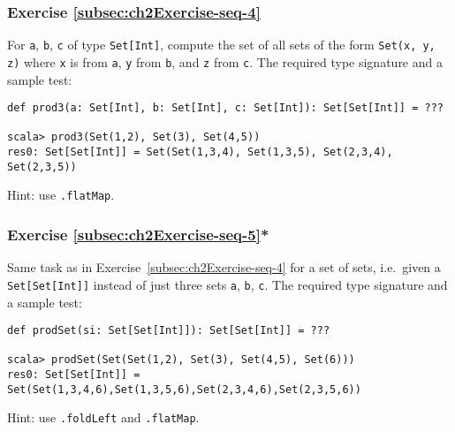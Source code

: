 \subsubsection{Exercise \label{subsec:ch2Exercise-seq-4}\ref{subsec:ch2Exercise-seq-4}}

For \lstinline!a!, \lstinline!b!, \lstinline!c! of type \lstinline!Set[Int]!,
compute the set of all sets of the form \lstinline!Set(x, y, z)!
where \lstinline!x! is from \lstinline!a!, \lstinline!y! from \lstinline!b!,
and \lstinline!z! from \lstinline!c!. The required type signature
and a sample test:
\begin{lstlisting}
def prod3(a: Set[Int], b: Set[Int], c: Set[Int]): Set[Set[Int]] = ???

scala> prod3(Set(1,2), Set(3), Set(4,5))
res0: Set[Set[Int]] = Set(Set(1,3,4), Set(1,3,5), Set(2,3,4), Set(2,3,5))
\end{lstlisting}

Hint: use \lstinline!.flatMap!.%
\begin{comment}
Solution:
\begin{lstlisting}
def prod3(a: Set[Int], b: Set[Int], c: Set[Int]): Set[Set[Int]] =     a.flatMap(x => b.flatMap(y => c.map(z => Set(x, y, z))))
\end{lstlisting}
\end{comment}


\subsubsection{Exercise \label{subsec:ch2Exercise-seq-5}\ref{subsec:ch2Exercise-seq-5}{*}}

Same task as in Exercise~\ref{subsec:ch2Exercise-seq-4} for a set
of sets, i.e.~given a \lstinline!Set[Set[Int]]! instead of just
three sets \lstinline!a!, \lstinline!b!, \lstinline!c!. The required
type signature and a sample test:
\begin{lstlisting}
def prodSet(si: Set[Set[Int]]): Set[Set[Int]] = ???

scala> prodSet(Set(Set(1,2), Set(3), Set(4,5), Set(6)))
res0: Set[Set[Int]] = Set(Set(1,3,4,6),Set(1,3,5,6),Set(2,3,4,6),Set(2,3,5,6))
\end{lstlisting}

Hint: use \lstinline!.foldLeft! and \lstinline!.flatMap!.%
\begin{comment}
Solution:
\begin{lstlisting}
def prodSet(sets: Set[Set[Int]]): Set[Set[Int]] =     sets.foldLeft(Set[Set[Int]](Set())) {
      // Combine each of results so far with each element in current set
      case (accumSet: Set[Set[Int]], currSet: Set[Int]) =>
        for {
          s <- accumSet
          i <- currSet
        } yield s + i
      }
\end{lstlisting}
\end{comment}


